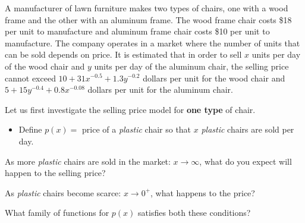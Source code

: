 \begin{slide}

\question 

\begin{problem}%
	A manufacturer of lawn furniture makes two types of chairs, one with a wood frame and the other with an aluminum frame. The wood frame chair costs \$18 per unit to manufacture and aluminum frame chair costs \$10 per unit to manufacture. The company operates in a market where the number of units that can be sold depends on price. It is estimated that in order to sell $x$ units per day of the wood chair and $y$ units per day of the aluminum chair, the selling price cannot exceed $10 + 31x^{-0.5} + 1.3y^{-0.2}$ dollars per unit for the wood chair and $5 + 15y^{-0.4} + 0.8x^{-0.08}$ dollars per unit for the aluminum chair.
\end{problem}


Let us first investigate the selling price model for \textbf{one type} of chair. 

\begin{itemize}
	\item Define $p(x) = $ price of a \textsl{plastic} chair so that $x$ \textsl{plastic} chairs are sold per day.
\end{itemize}


\begin{parts}
	\item As more \textsl{plastic} chairs are sold in the market: $x \to \infty$, what do you expect will happen to the selling price?
	
	
	\item As \textsl{plastic} chairs become scarce: $x \to 0^+$, what happens to the price?
	
	
	\item What family of functions for $p(x)$ satisfies both these conditions?
	
	
\end{parts}
 

	
\end{slide}


